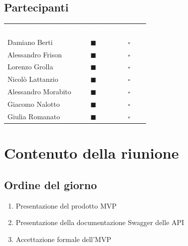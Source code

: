 \documentclass[a4paper, 11pt]{article}
\begin{document}
\subsection{Partecipanti}
\begin{center}
    \begin{tabular}{>{\raggedright\arraybackslash}p{6cm} c c}
        \rowcolor{AccentColor}
        \textcolor{white}{\textbf{Nome e Cognome}} & 
        \textcolor{white}{\textbf{Presente}} & 
        \textcolor{white}{\textbf{Assente}} \\
        
        Damiano Berti     & \textcolor{AccentColor}{$\blacksquare$}    & $\square$        \\
        Alessandro Frison     & \textcolor{AccentColor}{$\blacksquare$}    & $\square$        \\
        Lorenzo Grolla     & \textcolor{AccentColor}{$\blacksquare$}    & $\square$        \\
        Nicolò Lattanzio    & \textcolor{AccentColor}{$\blacksquare$}    & $\square$        \\
        Alessandro Morabito   & \textcolor{AccentColor}{$\blacksquare$}    & $\square$        \\
        Giacomo Nalotto   & \textcolor{AccentColor}{$\blacksquare$}    & $\square$        \\
        Giulia Romanato   & \textcolor{AccentColor}{$\blacksquare$}    & $\square$        \\
    \end{tabular}
\end{center}

\section{Contenuto della riunione}

\subsection{Ordine del giorno}
\begin{enumerate}
    \item Presentazione del prodotto MVP
    \item Presentazione della documentazione Swagger delle API
    \item Accettazione formale dell'MVP
\end{enumerate}
\end{document}
